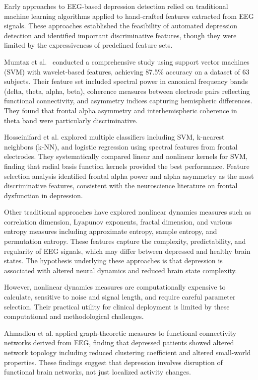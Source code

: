 \documentclass[blue,fullpaper]{ludusofficial}  %
\begin{document}
Early approaches to EEG-based depression detection relied on traditional machine learning algorithms applied to hand-crafted features extracted from EEG signals. These approaches established the feasibility of automated depression detection and identified important discriminative features, though they were limited by the expressiveness of predefined feature sets.

Mumtaz et al.~\cite{mumtaz2017machine} conducted a comprehensive study using support vector machines (SVM) with wavelet-based features, achieving 87.5\% accuracy on a dataset of 63 subjects. Their feature set included spectral power in canonical frequency bands (delta, theta, alpha, beta), coherence measures between electrode pairs reflecting functional connectivity, and asymmetry indices capturing hemispheric differences. They found that frontal alpha asymmetry and interhemispheric coherence in theta band were particularly discriminative.

Hosseinifard et al. explored multiple classifiers including SVM, k-nearest neighbors (k-NN), and logistic regression using spectral features from frontal electrodes. They systematically compared linear and nonlinear kernels for SVM, finding that radial basis function kernels provided the best performance. Feature selection analysis identified frontal alpha power and alpha asymmetry as the most discriminative features, consistent with the neuroscience literature on frontal dysfunction in depression.

Other traditional approaches have explored nonlinear dynamics measures such as correlation dimension, Lyapunov exponents, fractal dimension, and various entropy measures including approximate entropy, sample entropy, and permutation entropy. These features capture the complexity, predictability, and regularity of EEG signals, which may differ between depressed and healthy brain states. The hypothesis underlying these approaches is that depression is associated with altered neural dynamics and reduced brain state complexity.

However, nonlinear dynamics measures are computationally expensive to calculate, sensitive to noise and signal length, and require careful parameter selection. Their practical utility for clinical deployment is limited by these computational and methodological challenges.

Ahmadlou et al. applied graph-theoretic measures to functional connectivity networks derived from EEG, finding that depressed patients showed altered network topology including reduced clustering coefficient and altered small-world properties. These findings suggest that depression involves disruption of functional brain networks, not just localized activity changes.
\end{document}

